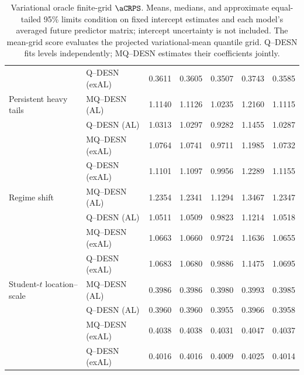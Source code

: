 \begin{table}[p]
\begin{tabular}{@{}>{\raggedright\arraybackslash}p{}>{\raggedright\arraybackslash}p{}rrrrr@{}}
 & Q--DESN (exAL) & 0.3611 & 0.3605 & 0.3507 & 0.3743 & 0.3585 \\
\addlinespace[2pt]
Persistent heavy tails & MQ--DESN (AL) & 1.1140 & 1.1126 & 1.0235 & 1.2160 & 1.1115 \\
 & Q--DESN (AL) & 1.0313 & 1.0297 & 0.9282 & 1.1455 & 1.0287 \\
 & MQ--DESN (exAL) & 1.0764 & 1.0741 & 0.9711 & 1.1985 & 1.0732 \\
 & Q--DESN (exAL) & 1.1101 & 1.1097 & 0.9956 & 1.2289 & 1.1155 \\
\addlinespace[2pt]
Regime shift & MQ--DESN (AL) & 1.2354 & 1.2341 & 1.1294 & 1.3467 & 1.2347 \\
 & Q--DESN (AL) & 1.0511 & 1.0509 & 0.9823 & 1.1214 & 1.0518 \\
 & MQ--DESN (exAL) & 1.0663 & 1.0660 & 0.9724 & 1.1636 & 1.0655 \\
 & Q--DESN (exAL) & 1.0683 & 1.0680 & 0.9886 & 1.1475 & 1.0695 \\
\addlinespace[2pt]
Student-\(t\) location--scale & MQ--DESN (AL) & 0.3986 & 0.3986 & 0.3980 & 0.3993 & 0.3985 \\
 & Q--DESN (AL) & 0.3960 & 0.3960 & 0.3955 & 0.3966 & 0.3958 \\
 & MQ--DESN (exAL) & 0.4038 & 0.4038 & 0.4031 & 0.4047 & 0.4037 \\
 & Q--DESN (exAL) & 0.4016 & 0.4016 & 0.4009 & 0.4025 & 0.4014 \\
\bottomrule
\end{tabular}
\caption{Variational oracle finite-grid \(\aCRPS\). Means, medians, and approximate equal-tailed 95\% limits condition on fixed intercept estimates and each model's averaged future predictor matrix; intercept uncertainty is not included. The mean-grid score evaluates the projected variational-mean quantile grid. Q--DESN fits levels independently; MQ--DESN estimates their coefficients jointly.}
\label{tab:joint-qdesn-pure-desn-v2-vb-score}
\end{table}
